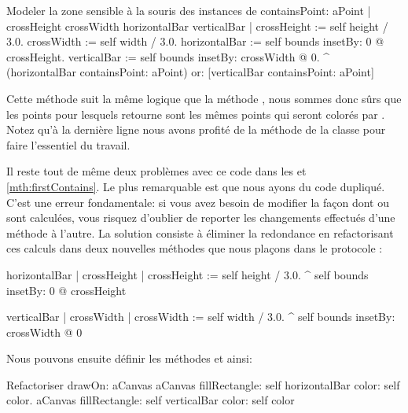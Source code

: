 \documentclass[a4paper,10pt,twoside]{book}
\begin{document}

\begin{method}[firstContains]{Modeler la zone sensible à la souris des instances de }
containsPoint: aPoint
	| crossHeight crossWidth horizontalBar verticalBar |
	crossHeight := self height / 3.0.
	crossWidth := self width / 3.0.
	horizontalBar := self bounds insetBy: 0 @ crossHeight.
	verticalBar := self bounds insetBy: crossWidth @ 0.
	^ (horizontalBar containsPoint: aPoint)
		or: [verticalBar containsPoint: aPoint]
\end{method}

Cette méthode suit la même logique que la méthode , 
nous sommes donc sûrs que les points pour lesquels
 retourne  sont les mêmes points qui
seront colorés par .
Notez qu'à 
la dernière ligne nous avons profité de la méthode
de la classe  pour faire l'essentiel du travail.

Il reste tout de même deux problèmes avec ce code dans les 
 et \ref{mth:firstContains}.
Le plus remarquable est que nous ayons du code dupliqué.
C'est une erreur fondamentale: si vous avez besoin de modifier la
façon dont  ou  sont
calculées, vous risquez d'oublier de reporter les changements
effectués d'une méthode à l'autre.
La solution consiste à éliminer la redondance en refactorisant ces
calculs dans deux nouvelles méthodes que nous plaçons dans le
protocole :

\begin{method}{}
horizontalBar
	| crossHeight |
	crossHeight := self height / 3.0.
	^ self bounds insetBy: 0 @ crossHeight
\end{method}

\begin{method}{}
verticalBar
	| crossWidth |
	crossWidth := self width / 3.0.
	^ self bounds insetBy: crossWidth @ 0
\end{method}

\noindent
Nous pouvons ensuite définir les méthodes  et
 ainsi:

\begin{method}{Refactoriser }
drawOn: aCanvas 
	aCanvas fillRectangle: self horizontalBar color: self color.
	aCanvas fillRectangle: self verticalBar color: self color
\end{method}
\end{document}
